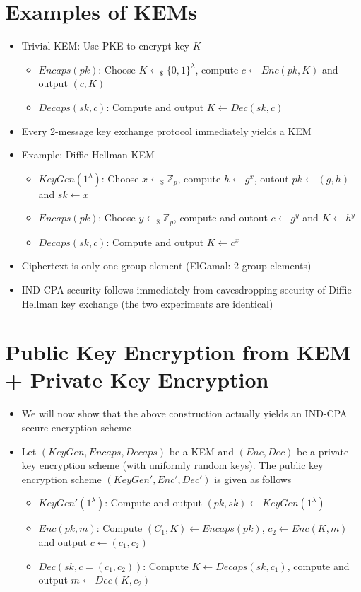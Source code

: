 \section{Examples of KEMs}
	\begin{itemize}
		\item Trivial KEM: Use PKE to encrypt key $K$
		\begin{itemize}
			\item $Encaps(pk)$: Choose $K \leftarrow_{\$} \{0,1\}^{\lambda}$, compute $c \leftarrow Enc(pk,K)$ and output $(c,K)$
			\item $Decaps(sk,c)$: Compute and output $K \leftarrow Dec(sk,c)$
		\end{itemize}
		\item Every 2-message key exchange protocol immediately yields a KEM
		\item Example: Diffie-Hellman KEM
		\begin{itemize}
			\item $KeyGen(1^{\lambda})$: Choose $x \leftarrow_{\$} \mathbb{Z}_p$, compute $h \leftarrow g^x$, outout $pk \leftarrow (g,h)$ and $sk \leftarrow x$
			\item $Encaps(pk)$: Choose $y \leftarrow_{\$} \mathbb{Z}_p$, compute and outout $c \leftarrow g^y$ and $K \leftarrow h^y$
			\item $Decaps(sk,c)$: Compute and output $K \leftarrow c^x$
		\end{itemize}
		\item Ciphertext is only one group element (ElGamal: 2 group elements)
		\item IND-CPA security follows immediately from eavesdropping security of Diffie-Hellman key exchange (the two experiments are identical)
	\end{itemize}

\section{Public Key Encryption from KEM + Private Key Encryption}
	\begin{itemize}
		\item We will now show that the above construction actually yields an IND-CPA secure encryption scheme
		\item Let $(KeyGen,Encaps,Decaps)$ be a KEM and $(Enc,Dec)$ be a private key encryption scheme (with uniformly random keys).
		The public key encryption scheme $(KeyGen',Enc',Dec')$ is given as follows
		\begin{itemize}
			\item $KeyGen'(1^{\lambda})$: Compute and output $(pk,sk) \leftarrow KeyGen(1^{\lambda})$
			\item $Enc(pk,m)$: Compute $(C_1,K) \leftarrow Encaps(pk)$, $c_2 \leftarrow Enc(K,m)$ and output $c \leftarrow (c_1,c_2)$
			\item $Dec(sk,c=(c_1,c_2))$: Compute $K \leftarrow Decaps(sk,c_1)$, compute and output $m \leftarrow Dec(K,c_2)$
		\end{itemize}
	\end{itemize}

